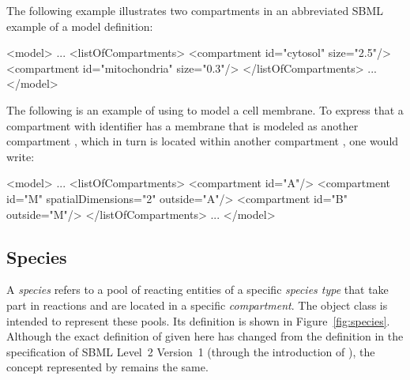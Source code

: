 The following example illustrates two compartments in an
abbreviated SBML example of a model definition:

\begin{example}
<model>
    ...
    <listOfCompartments>
        <compartment id="cytosol" size="2.5"/>
        <compartment id="mitochondria" size="0.3"/>
    </listOfCompartments>
    ...
</model>

\end{example}

The following is an example of using  to model a
cell membrane.  To express that a compartment with identifier
 has a membrane that is modeled as another compartment
, which in turn is located within another compartment
, one would write:

\begin{example}
<model>
    ...
    <listOfCompartments>
        <compartment id="A"/>
        <compartment id="M" spatialDimensions="2" outside="A"/>
        <compartment id="B" outside="M"/>
    </listOfCompartments>
    ...
</model>
\end{example}


\subsection{Species}
\label{sec:species}

A \emph{species} refers to a pool of reacting entities of a
specific \emph{species type} that take part in reactions and are
located in a specific \emph{compartment}.  The \Species
object class
is intended to represent these pools.  Its definition is
shown in Figure~\vref{fig:species}.  Although the exact definition
of \Species given here has changed from the definition in the
specification of SBML Level~2 Version~1 (\ie through the
introduction of \SpeciesType), the concept represented by \Species
remains the same.

